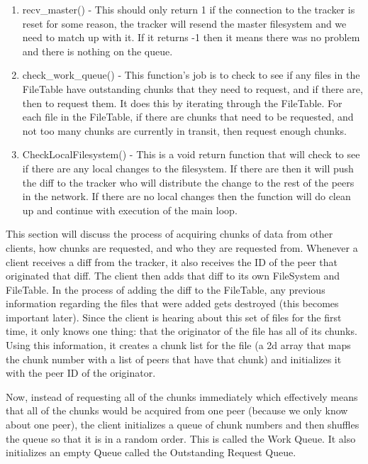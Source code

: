 \begin{enumerate}
		\item recv_master() - This should only return 1 if the connection to the tracker is reset for some reason, the tracker will resend the master filesystem and we need to match up with it. If it returns -1 then it means there was no problem and there is nothing on the queue.
		\item check_work_queue() - This function's job is to check to see if any files in the FileTable have outstanding chunks that they need to request, and if there are, then to request them. It does this by iterating through the FileTable. For each file in the FileTable, if there are chunks that need to be requested, and not too many chunks are currently in transit, then request enough chunks.
		\item CheckLocalFilesystem() - This is a void return function that will check to see if there are any local changes to the filesystem.  If there are then it will push the diff to the tracker who will distribute the change to the rest of the peers in the network.  If there are no local changes then the function will do clean up and continue with execution of the main loop.
	\end{enumerate}


	This section will discuss the process of acquiring chunks of data from other clients, how chunks are requested, and who they are requested from. Whenever a client receives a diff from the tracker, it also receives the ID of the peer that originated that diff. The client then adds that diff to its own FileSystem and FileTable. In the process of adding the diff to the FileTable, any previous information regarding the files that were added gets destroyed (this becomes important later). Since the client is hearing about this set of files for the first time, it only knows one thing: that the originator of the file has all of its chunks. Using this information, it creates a chunk list for the file (a 2d array that maps the chunk number with a list of peers that have that chunk) and initializes it with the peer ID of the originator.
	
	Now, instead of requesting all of the chunks immediately which effectively means that all of the chunks would be acquired from one peer (because we only know about one peer), the client initializes a queue of chunk numbers and then shuffles the queue so that it is in a random order. This is called the Work Queue. It also initializes an empty Queue called the Outstanding Request Queue.
	
